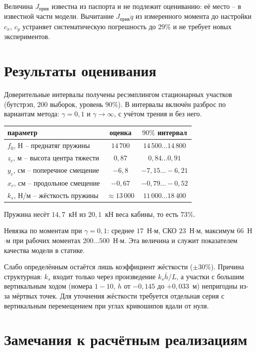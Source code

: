 Величина $J_{\text{прив}}$ известна из паспорта и не подлежит оцениванию: её место -- в известной части модели. Вычитание $J_{\text{прив}}\ddot{q}$ из измеренного момента до настройки $c_x$, $c_y$ устраняет систематическую погрешность до $29\%$ и не требует новых экспериментов.

\section{Результаты оценивания}

Доверительные интервалы получены ресэмплингом стационарных участков (бутстрэп, 200 выборок, уровень $90\%$). В интервалы включён разброс по вариантам метода: $\gamma = 0{,}1$ и $\gamma \to \infty$, с учётом трения и без него.

\begin{center}
\begin{tabular}{l|c|c}
параметр & оценка & $90\%$ интервал\\
\hline
$f_0$, Н -- преднатяг пружины & $14\,700$ & $14\,500\ldots14\,800$\\
$z_c$, м -- высота центра тяжести & $0{,}87$ & $0{,}84\ldots0{,}91$\\
$y_c$, см -- поперечное смещение & $-6{,}8$ & $-7{,}15\ldots-6{,}21$\\
$x_c$, см -- продольное смещение & $-0{,}67$ & $-0{,}79\ldots-0{,}52$\\
$k_s$, Н/м -- жёсткость пружины & $\approx13\,000$ & $11\,000\ldots18\,400$\\
\end{tabular}
\end{center}

Пружина несёт $14{,}7$~кН из $20{,}1$~кН веса кабины, то есть $73\%$.

Невязка по моментам при $\gamma = 0{,}1$: среднее $17$~Н$\cdot$м, СКО $23$~Н$\cdot$м, максимум $66$~Н$\cdot$м при рабочих моментах $200\ldots500$~Н$\cdot$м. Эта величина и служит показателем качества модели в статике.

Слабо определённым остаётся лишь коэффициент жёсткости ($\pm30\%$). Причина структурная: $k_s$ входит только через произведение $k_s\bar{h}/L$, а участки с большим вертикальным ходом (номера $1-10$, $h$ от $-0{,}145$ до $+0{,}033$~м) непригодны из-за мёртвых точек. Для уточнения жёсткости требуется отдельная серия с вертикальным перемещением при углах кривошипов вдали от нуля.

\section{Замечания к расчётным реализациям}

